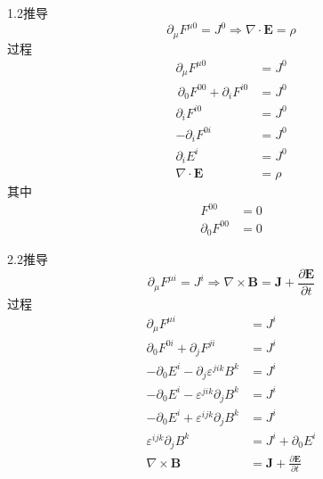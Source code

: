 1.2推导
\begin{equation}
    \partial _{\mu}F^{\mu 0}=J^0\Rightarrow \nabla \cdot \mathbf{E}=\rho 
\end{equation}
过程
\begin{equation}
    \begin{aligned}
        \partial _{\mu}F^{\mu 0}&=J^0
\\
\,\partial _0F^{00}+\partial _iF^{i0}&=J^0
\\
\partial _iF^{i0}&=J^0
\\
-\partial _iF^{0i}&=J^0
\\
\partial _iE^i&=J^0
\\
\nabla \cdot \mathbf{E}&=\rho 
    \end{aligned}
\end{equation}
其中
\begin{equation}
    \begin{aligned}
        F^{00}&=0
\\
\partial _0F^{00}&=0
    \end{aligned}
\end{equation}




2.2推导
\begin{equation}
    \partial _{\mu}F^{\mu i}=J^i\Rightarrow \nabla \times \mathbf{B}=\mathbf{J}+\frac{\partial \mathbf{E}}{\partial t}
\end{equation}
过程
\begin{equation}
    \begin{aligned}
        \partial _{\mu}F^{\mu i}&=J^i
\\
\partial _0F^{0i}+\partial _jF^{ji}&=J^i
\\
-\partial _0E^i-\partial _j\varepsilon ^{jik}B^k&=J^i
\\
-\partial _0E^i-\varepsilon ^{jik}\partial _jB^k&=J^i
\\
-\partial _0E^i+\varepsilon ^{ijk}\partial _jB^k&=J^i
\\
\varepsilon ^{ijk}\partial _jB^k&=J^i+\partial _0E^i
\\
\nabla \times \mathbf{B}&=\mathbf{J}+\frac{\partial \mathbf{E}}{\partial t}
    \end{aligned}
\end{equation}




